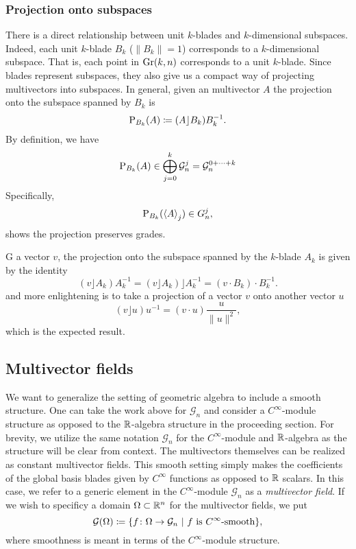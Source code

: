 \subsubsection{Projection onto subspaces}

There is a direct relationship between unit $k$-blades and $k$-dimensional subspaces.  Indeed, each unit $k$-blade $B_k$ ($\|B_k\|=1$) corresponds to a $k$-dimensional subspace.  That is, each point in $\Grassmannian{k}{n}$ corresponds to a unit $k$-blade.  Since blades represent subspaces, they also give us a compact way of projecting multivectors into subspaces.  In general, given an multivector $A$ the projection onto the subspace spanned by $B_k$ is
\begin{equation}
\label{eq:projection}
\projection{B_k}{A} \coloneqq (A\rfloor B_k)B_k^{-1}.
\end{equation}
By definition, we have
\[
\projection{B_k}{A} \in \bigoplus_{j=0}^k \G_n^j = \G_n^{0+\cdots + k}
\]
Specifically,
\[
\projection{B_k}{\proj{j}{A}} \in G_n^j,
\]
shows the projection preserves grades.

G a vector $v$, the projection onto the subspace spanned by the $k$-blade $A_k$ is given by the identity
\begin{equation}
\label{eq:vector_projection}
(v\rfloor A_k )A_k^{-1} = (v\rfloor A_k)\rfloor A_k^{-1} = (v\cdot B_k)\cdot B_k^{-1}.
\end{equation}
and more enlightening is to take a projection of a vector $v$ onto another vector $u$
\[
(v\rfloor u)u^{-1} = (v \cdot u) \frac{u}{\|u\|^2},
\]
which is the expected result. 


\subsection{Multivector fields}

We want to generalize the setting of geometric algebra to include a smooth structure. One can take the work above for $\mathcal{G}_n$ and consider a $C^{\infty}$-module structure as opposed to the $\R$-algebra structure in the proceeding section. For brevity, we utilize the same notation $\mathcal{G}_n$ for the $C^\infty$-module and $\R$-algebra as the structure will be clear from context. The multivectors themselves can be realized as constant multivector fields. This smooth setting simply makes the coefficients of the global basis blades given by $C^\infty$ functions as opposed to $\R$ scalars.  In this case, we refer to a generic element in the $C^{\infty}$-module $\mathcal{G}_n$ as a \emph{multivector field}. If we wish to specificy a domain $\Omega \subset \R^n$ for the multivector fields, we put
\[
\multivectorfieldson{\Omega} \coloneqq \{ f \colon \Omega \to \G_n ~\vert~ \textrm{$f$ is $C^\infty$-smooth}\},
\]
where smoothness is meant in terms of the $C^\infty$-module structure.

